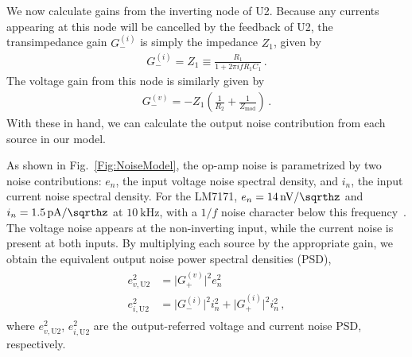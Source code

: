 \documentclass[aip,rsi,reprint]{revtex4-1} %
\begin{document}
We now calculate gains from the inverting node of U2.
Because any currents appearing at this node will be cancelled by the feedback of U2, the transimpedance gain $G_{-}^{(i)}$ is simply the impedance $Z_1$, given by
\begin{align}
G_{-}^{(i)} = Z_1 \equiv \frac{R_1}{1+2\pi i f R_1 C_1}\,.
\end{align}
The voltage gain from this node is similarly given by
\begin{align}
G_{-}^{(v)} = -Z_1 \left(\frac{1}{R_2} + \frac{1}{Z_\text{mod}}\right)\,.
\end{align}
With these in hand, we can calculate the output noise contribution from each source in our model.

As shown in Fig.~\ref{Fig:NoiseModel}, the op-amp noise is parametrized by two noise contributions: $e_n$, the input voltage noise spectral density, and $i_n$, the input current noise spectral density.
For the LM7171, $e_n = \SI[per-mode=symbol]{14}{\nano\volt\per\sqrthz}$ and $i_n = \SI[per-mode=symbol]{1.5}{\pico\ampere\per\sqrthz}$ at $\SI{10}{\kilo\hertz}$, with a $1/f$ noise character below this frequency~\cite{LM7171Datasheet}.
The voltage noise appears at the non-inverting input, while the current noise is present at both inputs.
By multiplying each source by the appropriate gain, we obtain the equivalent output noise power spectral densities (PSD),
\begin{align}
\begin{split}
e^2_{v,\text{U2}} &= \big|G_{+}^{(v)}\big|^2 e^2_n \\
e^2_{i,\text{U2}} &= \big|G_{-}^{(i)}\big|^2 i^2_n + \big|G_{+}^{(i)}\big|^2 i^2_n\,,
\end{split}
\end{align}
where  $e^2_{v,\text{U2}}$, $e^2_{i,\text{U2}}$ are the output-referred voltage and current noise PSD, respectively.




\end{document}
